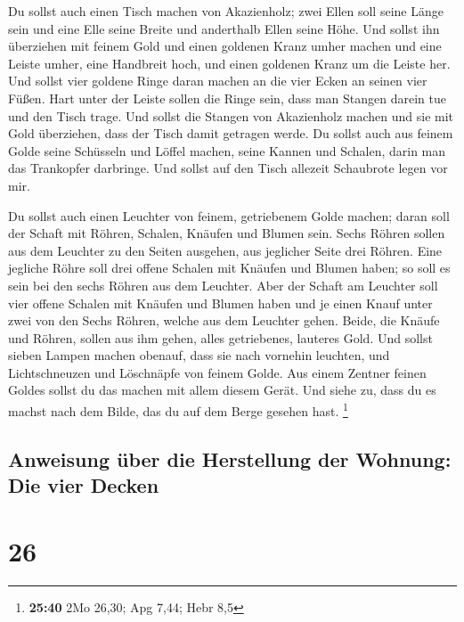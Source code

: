  Du sollst auch einen Tisch machen von Akazienholz; zwei
Ellen soll seine Länge sein und eine Elle seine Breite und anderthalb
Ellen seine Höhe.  Und sollst ihn überziehen mit feinem
Gold und einen goldenen Kranz umher machen  und eine
Leiste umher, eine Handbreit hoch, und einen goldenen Kranz um die
Leiste her.  Und sollst vier goldene Ringe daran machen
an die vier Ecken an seinen vier Füßen.  Hart unter der
Leiste sollen die Ringe sein, dass man Stangen darein tue und den Tisch
trage.  Und sollst die Stangen von Akazienholz machen und
sie mit Gold überziehen, dass der Tisch damit getragen werde.
 Du sollst auch aus feinem Golde seine Schüsseln und
Löffel machen, seine Kannen und Schalen, darin man das Trankopfer
darbringe.  Und sollst auf den Tisch allezeit Schaubrote
legen vor mir.

 Du sollst auch einen Leuchter von feinem, getriebenem
Golde machen; daran soll der Schaft mit Röhren, Schalen, Knäufen und
Blumen sein.  Sechs Röhren sollen aus dem Leuchter zu den
Seiten ausgehen, aus jeglicher Seite drei Röhren.  Eine
jegliche Röhre soll drei offene Schalen mit Knäufen und Blumen haben; so
soll es sein bei den sechs Röhren aus dem Leuchter.  Aber
der Schaft am Leuchter soll vier offene Schalen mit Knäufen und Blumen
haben  und je einen Knauf unter zwei von den Sechs
Röhren, welche aus dem Leuchter gehen.  Beide, die Knäufe
und Röhren, sollen aus ihm gehen, alles getriebenes, lauteres Gold.
 Und sollst sieben Lampen machen obenauf, dass sie nach
vornehin leuchten,  und Lichtschneuzen und Löschnäpfe von
feinem Golde.  Aus einem Zentner feinen Goldes sollst du
das machen mit allem diesem Gerät.  Und siehe zu, dass du
es machst nach dem Bilde, das du auf dem Berge gesehen hast. \footnote{\textbf{25:40}
  2Mo 26,30; Apg 7,44; Hebr 8,5}

\hypertarget{anweisung-uxfcber-die-herstellung-der-wohnung-die-vier-decken}{%
\subsection{Anweisung über die Herstellung der Wohnung: Die vier
Decken}\label{anweisung-uxfcber-die-herstellung-der-wohnung-die-vier-decken}}

\hypertarget{section-25}{%
\section{26}\label{section-25}}


